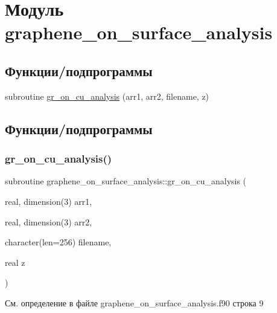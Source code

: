 \hypertarget{namespacegraphene__on__surface__analysis}{}\section{Модуль graphene\+\_\+on\+\_\+surface\+\_\+analysis}
\label{namespacegraphene__on__surface__analysis}
\subsection*{Функции/подпрограммы}
\begin{DoxyCompactItemize}
\item 
subroutine \mbox{\hyperlink{namespacegraphene__on__surface__analysis_a02cffcc8904565bfaf36c4503f30f759}{gr\+\_\+on\+\_\+cu\+\_\+analysis}} (arr1, arr2, filename, z)
\end{DoxyCompactItemize}


\subsection{Функции/подпрограммы}
\mbox{\label{namespacegraphene__on__surface__analysis_a02cffcc8904565bfaf36c4503f30f759}} 
\subsubsection{\texorpdfstring{gr\+\_\+on\+\_\+cu\+\_\+analysis()}{gr\_on\_cu\_analysis()}}
{\footnotesize\ttfamily subroutine graphene\+\_\+on\+\_\+surface\+\_\+analysis\+::gr\+\_\+on\+\_\+cu\+\_\+analysis (\begin{DoxyParamCaption}\item[{real, dimension(3)}]{arr1,  }\item[{real, dimension(3)}]{arr2,  }\item[{character(len=256)}]{filename,  }\item[{real}]{z }\end{DoxyParamCaption})}



См. определение в файле graphene\+\_\+on\+\_\+surface\+\_\+analysis.\+f90 строка 9


